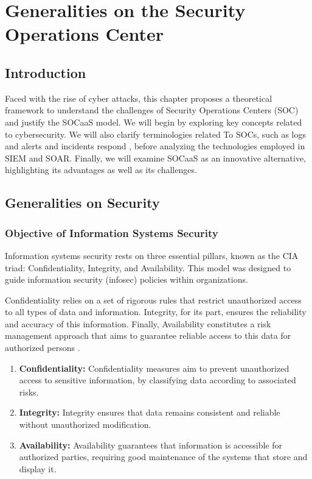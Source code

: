 \setcounter{chapter}{1}
\chapter{Generalities on the Security Operations Center}
\label{chap:generalities}

\section{Introduction}
\label{sec:ch2-intro}

Faced with the rise of cyber attacks, this chapter proposes a theoretical framework to understand the challenges of Security Operations Centers (SOC) and justify the SOCaaS model. We will begin by exploring key concepts related to cybersecurity. We will also clarify terminologies related To SOCs, such as logs and alerts and incidents respond , before analyzing the technologies employed in SIEM and SOAR. Finally, we will examine SOCaaS as an innovative alternative, highlighting its advantages as well as its challenges.

\section{Generalities on Security}
\label{sec:security}

\subsection{Objective of Information Systems Security}
\label{subsec:cia}

Information systems security rests on three essential pillars, known as the CIA triad: Confidentiality, Integrity, and Availability. This model was designed to guide information security (infosec) policies within organizations.

Confidentiality relies on a set of rigorous rules that restrict unauthorized access to all types of data and information. Integrity, for its part, ensures the reliability and accuracy of this information. Finally, Availability constitutes a risk management approach that aims to guarantee reliable access to this data for authorized persons \cite{ref6}.

\begin{enumerate}
    \item \textbf{Confidentiality:} Confidentiality measures aim to prevent unauthorized access to sensitive information, by classifying data according to associated risks.
    \item \textbf{Integrity:} Integrity ensures that data remains consistent and reliable without unauthorized modification.
    \item \textbf{Availability:} Availability guarantees that information is accessible for authorized parties, requiring good maintenance of the systems that store and display it.
\end{enumerate}

